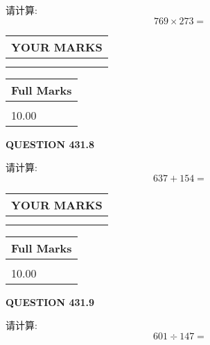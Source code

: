 \documentclass{ctexart}
\begin{document}
  
 
请计算:
\begin{equation}
769  \times    %
273 = \nonumber
\end{equation}
 

 

 
  
\vspace{0.2in}
  
\noindent\begin{tabular}{|l|}
\hline
 YOUR MARKS  \\
\hline
 \\ 
 \\ 
\hline
\end{tabular}
\hspace{0.05in} \begin{tabular}{|l|}
\hline
 Full Marks  \\
\hline
 \\ 
10.00 \\
\hline
\end{tabular}
{\textbf{\Large{QUESTION
431.8 
}}}
  
  
 
请计算:
\begin{equation}
637 +  %
154 = \nonumber
\end{equation}
 

 

 
  
\vspace{0.2in}
  
\noindent\begin{tabular}{|l|}
\hline
 YOUR MARKS  \\
\hline
 \\ 
 \\ 
\hline
\end{tabular}
\hspace{0.05in} \begin{tabular}{|l|}
\hline
 Full Marks  \\
\hline
 \\ 
10.00 \\
\hline
\end{tabular}
{\textbf{\Large{QUESTION
431.9 
}}}
  
  
 
请计算:
\begin{equation}
601  \div    %
147 = \nonumber
\end{equation}
 

 

 
  
\end{document}
